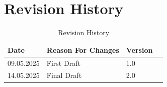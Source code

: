 \chapter*{Revision History}

 \begin{table}[h] 
 \centering
 \begin{tabularx}{0.8\textwidth}{|X|X|X|X|}
 \hline
Date & Reason For Changes & Version   \\ \hline
09.05.2025 & First Draft  & 1.0 \\ \hline
14.05.2025 & Final Draft  & 2.0    \\ \hline
\end{tabularx}
\caption{Revision History \label{Tab:Example}}

\end{table}
